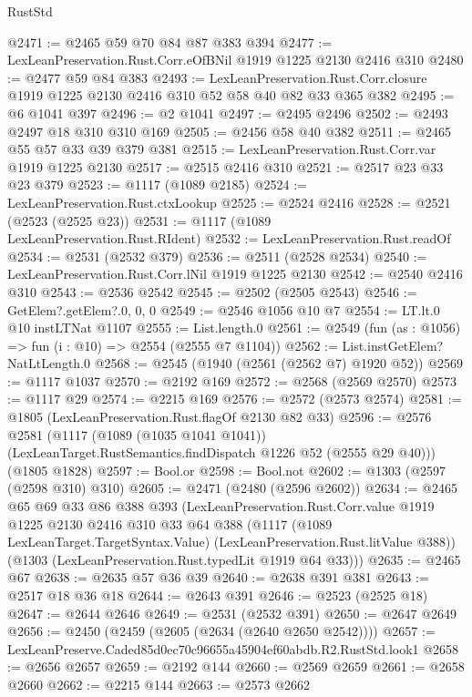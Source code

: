 \begin{lexlean}{RustStd}
\begin{coremodule}
@2471 := @2465 @59 @70 @84 @87 @383 @394
@2477 := LexLeanPreservation.Rust.Corr.eOfBNil @1919 @1225 @2130 @2416 @310
@2480 := @2477 @59 @84 @383
@2493 := LexLeanPreservation.Rust.Corr.closure
    @1919
    @1225
    @2130
    @2416
    @310
    @52
    @58
    @40
    @82
    @33
    @365
    @382
@2495 := @6 @1041 @397
@2496 := @2 @1041
@2497 := @2495 @2496
@2502 := @2493 @2497 @18 @310 @310 @169
@2505 := @2456 @58 @40 @382
@2511 := @2465 @55 @57 @33 @39 @379 @381
@2515 := LexLeanPreservation.Rust.Corr.var @1919 @1225 @2130
@2517 := @2515 @2416 @310
@2521 := @2517 @23 @33 @23 @379
@2523 := @1117 (@1089 @2185)
@2524 := LexLeanPreservation.Rust.ctxLookup
@2525 := @2524 @2416
@2528 := @2521 (@2523 (@2525 @23))
@2531 := @1117 (@1089 LexLeanPreservation.Rust.RIdent)
@2532 := LexLeanPreservation.Rust.readOf
@2534 := @2531 (@2532 @379)
@2536 := @2511 (@2528 @2534)
@2540 := LexLeanPreservation.Rust.Corr.lNil @1919 @1225 @2130
@2542 := @2540 @2416 @310
@2543 := @2536 @2542
@2545 := @2502 (@2505 @2543)
@2546 := GetElem?.getElem?.{0, 0, 0}
@2549 := @2546 @1056 @10 @7
@2554 := LT.lt.{0} @10 instLTNat @1107
@2555 := List.length.{0}
@2561 := @2549 (fun (as : @1056) => fun (i : @10) => @2554 (@2555 @7 @1104))
@2562 := List.instGetElem?NatLtLength.{0}
@2568 := @2545 (@1940 (@2561 (@2562 @7) @1920 @52))
@2569 := @1117 @1037
@2570 := @2192 @169
@2572 := @2568 (@2569 @2570)
@2573 := @1117 @29
@2574 := @2215 @169
@2576 := @2572 (@2573 @2574)
@2581 := @1805 (LexLeanPreservation.Rust.flagOf @2130 @82 @33)
@2596 := @2576
    @2581
    (@1117
      (@1089 (@1035 @1041 @1041))
      (LexLeanTarget.RustSemantics.findDispatch @1226 @52 (@2555 @29 @40)))
    (@1805 @1828)
@2597 := Bool.or
@2598 := Bool.not
@2602 := @1303 (@2597 (@2598 @310) @310)
@2605 := @2471 (@2480 (@2596 @2602))
@2634 := @2465
    @65
    @69
    @33
    @86
    @388
    @393
    (LexLeanPreservation.Rust.Corr.value
      @1919
      @1225
      @2130
      @2416
      @310
      @33
      @64
      @388
      (@1117 (@1089 LexLeanTarget.TargetSyntax.Value) (LexLeanPreservation.Rust.litValue @388))
      (@1303 (LexLeanPreservation.Rust.typedLit @1919 @64 @33)))
@2635 := @2465 @67
@2638 := @2635 @57 @36 @39
@2640 := @2638 @391 @381
@2643 := @2517 @18 @36 @18
@2644 := @2643 @391
@2646 := @2523 (@2525 @18)
@2647 := @2644 @2646
@2649 := @2531 (@2532 @391)
@2650 := @2647 @2649
@2656 := @2450 (@2459 (@2605 (@2634 (@2640 @2650 @2542))))
@2657 := LexLeanPreserve.Caded85d0ec70c96655a45904ef60abdb.R2.RustStd.look1
@2658 := @2656 @2657
@2659 := @2192 @144
@2660 := @2569 @2659
@2661 := @2658 @2660
@2662 := @2215 @144
@2663 := @2573 @2662

\end{coremodule}
\end{lexlean}
